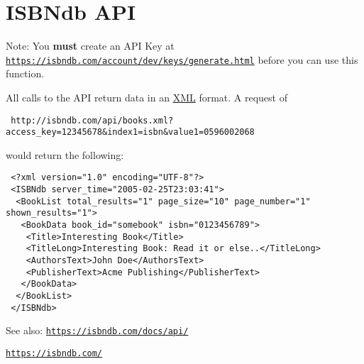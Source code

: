 \hypertarget{isbnapi}{}\section{ISBNdb API}\label{isbnapi}
\begin{Desc}
\item[Note:]You {\bf must} create an API Key at \href{https://isbndb.com/account/dev/keys/generate.html}{\tt https://isbndb.com/account/dev/keys/generate.html} before you can use this function.\end{Desc}
All calls to the API return data in an \hyperlink{classXML}{XML} format. A request of 

\begin{Code}\begin{verbatim} http://isbndb.com/api/books.xml?access_key=12345678&index1=isbn&value1=0596002068
\end{verbatim}
\end{Code}

 would return the following: 

\begin{Code}\begin{verbatim} <?xml version="1.0" encoding="UTF-8"?>
 <ISBNdb server_time="2005-02-25T23:03:41">
  <BookList total_results="1" page_size="10" page_number="1" shown_results="1">
   <BookData book_id="somebook" isbn="0123456789">
    <Title>Interesting Book</Title>
    <TitleLong>Interesting Book: Read it or else..</TitleLong>
    <AuthorsText>John Doe</AuthorsText>
    <PublisherText>Acme Publishing</PublisherText>
   </BookData>
  </BookList>
 </ISBNdb>
\end{verbatim}
\end{Code}

 \begin{Desc}
\item[See also:]\href{https://isbndb.com/docs/api/}{\tt https://isbndb.com/docs/api/} 

\href{https://isbndb.com/}{\tt https://isbndb.com/} \end{Desc}
